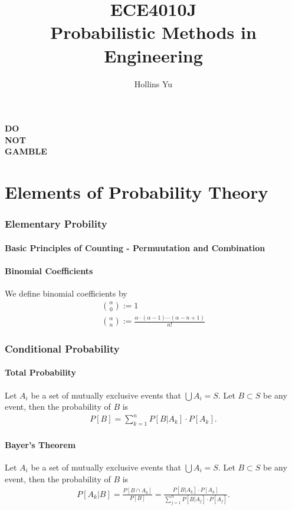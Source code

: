 \documentclass[11pt,a4paper]{article}
\begin{document}
\author{Hollins Yu}
\title{\bf  ECE4010J \\ \LARGE Probabilistic Methods in Engineering}
\maketitle
\newpage
\tableofcontents
\newpage
\noindent
{\fontsize{40pt}{20}\bf\color[RGB]{255,0,0}DO\\NOT\\GAMBLE}
\newpage

\part{Elements of Probability Theory}
\section{Elementary Probility}

\subsection{Basic Principles of Counting - Permuutation and Combination}

\subsection{Binomial Coefficients}
We define binomial coefficients by
\begin{gather}
    \binom{\alpha}{0} := 1 \\
    \binom{\alpha}{n}:=\frac{\alpha\cdot(\alpha-1)\cdots(\alpha-n+1)}{n!}
\end{gather}

\section{Conditional Probability}


\subsection{Total Probability}
Let $A_i$ be a set of mutually exclusive events that $\bigcup A_i=S$.
Let $B\subset S$ be any event, then the probability of $B$ is
\begin{gather}
    P[B]=\sum_{k=1}^{n}P[B|A_k]\cdot P[A_k].
\end{gather}
\subsection{Bayer's Theorem}
Let $A_i$ be a set of mutually exclusive events that $\bigcup A_i=S$.
Let $B\subset S$ be any event, then the probability of $B$ is
\begin{gather}
    P[A_k|B]=\frac{P[B\cap A_k]}{P[B]}=\frac{P[B| A_k]\cdot P[A_k]}{\sum_{j=1}^{n}P[B| A_j]\cdot P[A_j]}.
\end{gather}
\end{document}
